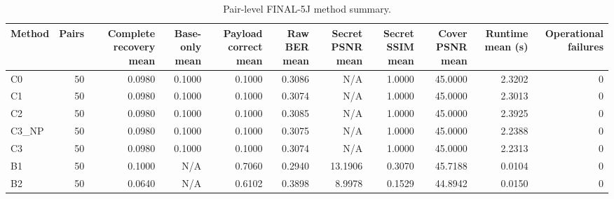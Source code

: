 \begin{table}[htbp]
\centering
\caption{Pair-level FINAL-5J method summary.}
\label{tab:5j-method-summary}
\begin{tabular}{lrrrrrrrrrr}
\toprule
Method & Pairs & Complete recovery mean & Base-only mean & Payload correct mean & Raw BER mean & Secret PSNR mean & Secret SSIM mean & Cover PSNR mean & Runtime mean (s) & Operational failures \\
\midrule
C0 & 50 & 0.0980 & 0.1000 & 0.1000 & 0.3086 & N/A & 1.0000 & 45.0000 & 2.3202 & 0 \\
C1 & 50 & 0.0980 & 0.1000 & 0.1000 & 0.3074 & N/A & 1.0000 & 45.0000 & 2.3013 & 0 \\
C2 & 50 & 0.0980 & 0.1000 & 0.1000 & 0.3085 & N/A & 1.0000 & 45.0000 & 2.3925 & 0 \\
C3\_NP & 50 & 0.0980 & 0.1000 & 0.1000 & 0.3075 & N/A & 1.0000 & 45.0000 & 2.2388 & 0 \\
C3 & 50 & 0.0980 & 0.1000 & 0.1000 & 0.3074 & N/A & 1.0000 & 45.0000 & 2.2313 & 0 \\
B1 & 50 & 0.1000 & N/A & 0.7060 & 0.2940 & 13.1906 & 0.3070 & 45.7188 & 0.0104 & 0 \\
B2 & 50 & 0.0640 & N/A & 0.6102 & 0.3898 & 8.9978 & 0.1529 & 44.8942 & 0.0150 & 0 \\
\bottomrule
\end{tabular}
\end{table}
